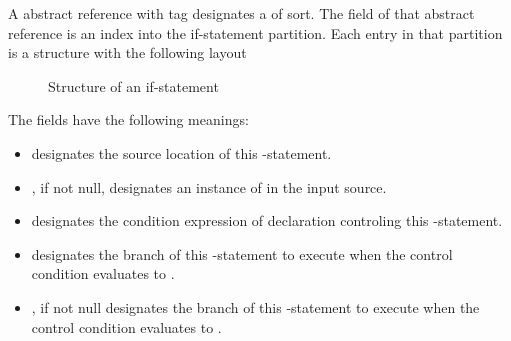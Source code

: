 A  abstract reference with tag  designates a  of  sort.
The  field of that abstract reference is an index into the if-statement partition.
Each entry in that partition is a structure with the following layout
%
\begin{figure}[H]
	\centering
	\caption{Structure of an if-statement}
	\label{fig:ifc-if-stmt-structure}
\end{figure}
%
The fields have the following meanings:
\begin{itemize}
	\item {} designates the source location of this -statement.
	\item {}, if not null, designates an instance of  in the input source.
	\item {} designates the condition expression of declaration controling this -statement.
	\item {} designates the branch of this -statement to execute when the control condition evaluates to .
	\item {}, if not null designates the branch of this -statement to execute when the control condition evaluates to .
\end{itemize}



\subsection{}
\label{sec:ifc:StmtSort:For}


